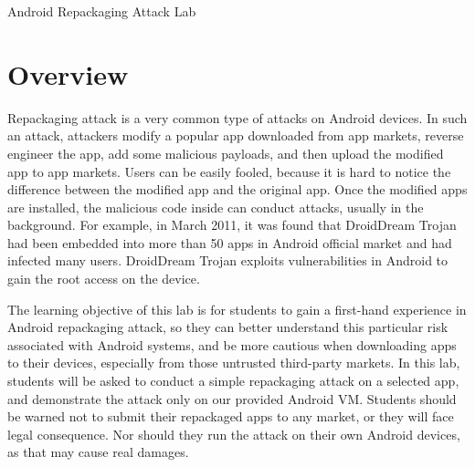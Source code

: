




\newcommand{\repackFigs}{./Figs}








\begin{center}
{\LARGE Android Repackaging Attack Lab}
\end{center}




\section{Overview}


Repackaging attack is a very common type of attacks on Android devices. 
In such an attack, attackers modify a popular app downloaded from app
markets, reverse engineer the app, add some malicious payloads, and then
upload the modified app to app markets. Users can be easily fooled, because
it is hard to notice the difference between the modified app and the
original app. Once the modified apps are installed, the malicious code
inside can conduct attacks, usually in the background. 
For example, in March 2011, it was found that DroidDream Trojan had
been embedded into more than 50 apps in Android official market and had
infected many users. DroidDream Trojan exploits vulnerabilities in Android
to gain the root access on the device. 


The learning objective of this lab is for students to gain a first-hand
experience in Android repackaging attack, so they can better understand 
this particular risk associated with Android systems, and be more cautious
when downloading apps to their devices, especially from those untrusted
third-party markets. In this lab, students will be
asked to conduct a simple repackaging attack on a selected app, and
demonstrate the attack only on our provided Android VM. Students should be warned not to
submit their repackaged apps to any market, or they will face legal
consequence. Nor should they run the attack on their own Android devices,
as that may cause real damages.



